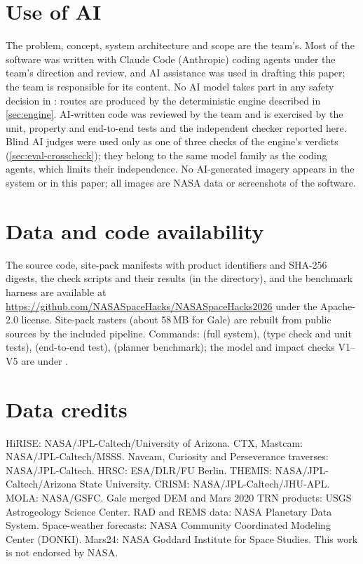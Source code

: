 \documentclass[10pt,twocolumn]{article}
\newcommand{\PaperRepo}{\url{https://github.com/NASASpaceHacks/NASASpaceHacks2026}}
\begin{document}









\appendix


\section*{Use of AI}
The problem, concept, system architecture and scope are the team's. Most of the software was written with Claude Code (Anthropic) coding agents under the team's direction and review, and AI assistance was used in drafting this paper; the team is responsible for its content. No AI model takes part in any safety decision in \Marswalk: routes are produced by the deterministic engine described in \cref{sec:engine}. AI-written code was reviewed by the team and is exercised by the unit, property and end-to-end tests and the independent checker reported here. Blind AI judges were used only as one of three checks of the engine's verdicts (\cref{sec:eval-crosscheck}); they belong to the same model family as the coding agents, which limits their independence. No AI-generated imagery appears in the system or in this paper; all images are NASA data or screenshots of the software.

\section*{Data and code availability}
The source code, site-pack manifests with product identifiers and SHA-256 digests, the check scripts and their results (in the  directory), and the benchmark harness are available at \PaperRepo{} under the Apache-2.0 license. Site-pack rasters (about 58\,MB for Gale) are rebuilt from public sources by the included pipeline. Commands:  (full system),  (type check and unit tests),  (end-to-end test),  (planner benchmark); the model and impact checks V1--V5 are under .

\section*{Data credits}
HiRISE: NASA/JPL-Caltech/University of Arizona. CTX, Mastcam: NASA/JPL-Caltech/MSSS. Navcam, Curiosity and Perseverance traverses: NASA/JPL-Caltech. HRSC: ESA/DLR/FU Berlin. THEMIS: NASA/JPL-Caltech/Arizona State University. CRISM: NASA/JPL-Caltech/JHU-APL. MOLA: NASA/GSFC. Gale merged DEM and Mars 2020 TRN products: USGS Astrogeology Science Center. RAD and REMS data: NASA Planetary Data System. Space-weather forecasts: NASA Community Coordinated Modeling Center (DONKI). Mars24: NASA Goddard Institute for Space Studies. This work is not endorsed by NASA.
\end{document}
